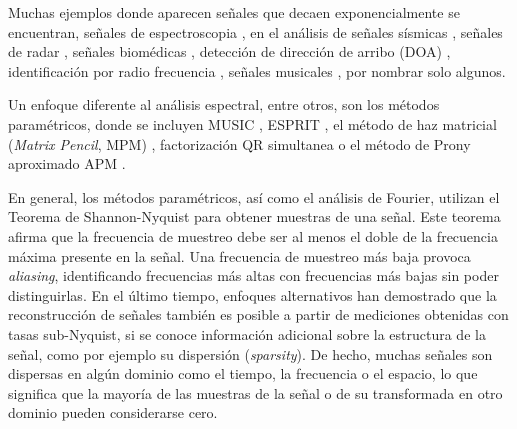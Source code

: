 Muchas ejemplos donde aparecen señales que decaen exponencialmente se encuentran, señales de espectroscopia \cite{Gudmundson2012}, en el análisis de señales sísmicas \cite{Soltaninejad2020}, señales de radar \cite{Cuyt2020, Sarkar2000}, señales biomédicas \cite{Bannis2014, Chon2001}, detección de dirección de arribo (DOA) \cite{Knaepkens2020}, identificación por radio frecuencia \cite{Rezaiesarlak2013}, señales musicales \cite{Laroche1993}, por nombrar solo algunos. 

Un enfoque diferente al análisis espectral, entre otros, son los métodos paramétricos, donde se incluyen MUSIC \cite{Schmidt1986}, ESPRIT \cite{Roy1989}, el método de haz matricial (\emph{Matrix Pencil}, MPM) \cite{Hua1990}, factorización QR simultanea  \cite{Golub1999} o el método de Prony aproximado APM \cite{Potts2010}.

En general, los métodos paramétricos, así como el análisis de Fourier, utilizan el Teorema de Shannon-Nyquist \cite{Nyquist1928, Shannon1949} para obtener muestras de una señal. Este teorema afirma que la frecuencia de muestreo debe ser al menos el doble de la frecuencia máxima presente en la señal. Una frecuencia de muestreo más baja provoca \emph{aliasing}, identificando frecuencias más altas con frecuencias más bajas sin poder distinguirlas. En el último tiempo, enfoques alternativos han demostrado que la reconstrucción de señales también es posible a partir de mediciones obtenidas con tasas sub-Nyquist, si se conoce información adicional sobre la estructura de la señal, como por ejemplo su dispersión (\emph{sparsity}). De hecho, muchas señales son dispersas en algún dominio como el tiempo, la frecuencia o el espacio, lo que significa que la mayoría de las muestras de la señal o de su transformada en otro dominio pueden considerarse cero. %

